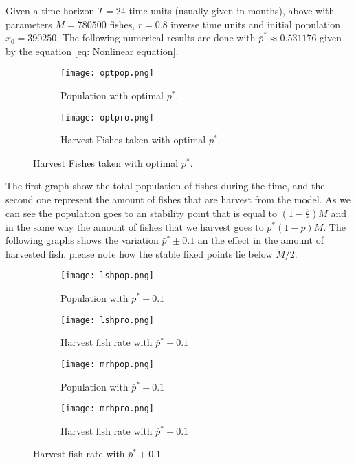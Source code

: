 Given a time horizon $\bar{T}=24$ time units (usually given in months), above with parameters $M=780500$ fishes, $r=0.8$ inverse time units and initial population $x_0=390250$. The following numerical results are done with $\bar{p}^*\approx 0.531176$ given by the equation \ref{eq: Nonlinear equation}. 

\begin{figure}[H]
	\centering
	\begin{subfigure}[b]{0.45\textwidth}
		\centering
		\texttt{[image: optpop.png]}
		\caption{Population with optimal $p^*$. }		
	\end{subfigure}
	\begin{subfigure}[b]{0.45\textwidth}
		\centering
		\texttt{[image: optpro.png]}
		\caption{Harvest Fishes taken with optimal $p^*$.}
	\end{subfigure}
\end{figure}

The first graph show the total population of fishes during the time, and the second one represent the amount of fishes that are harvest from the model. As we can see the population goes to an stability point that is equal to $\left(1-\frac{p}{r}\right)M$ and in the same way the amount of fishes that we harvest goes to $\bar{p}^*\left(1-\bar{p}\right)M$. The following graphs shows the variation $\bar{p}^*\pm0.1$  an the effect in the amount of harvested fish, please note how the stable fixed points lie below $M/2$:
\begin{figure}[H]
	\centering 
	\begin{subfigure}[b]{0.45\textwidth}
		\texttt{[image: lshpop.png]}
		\caption{Population with $\bar{p}^*-0.1$}		
	\end{subfigure}
	\begin{subfigure}[b]{0.45\textwidth}
		\texttt{[image: lshpro.png]}
		\caption{Harvest fish rate with $\bar{p}^*-0.1$}			
	\end{subfigure}
	\begin{subfigure}[b]{0.45\textwidth}
		\texttt{[image: mrhpop.png]}
		\caption{Population with $\bar{p}^*+0.1$}			
	\end{subfigure}
	\begin{subfigure}[b]{0.45\textwidth}
		\texttt{[image: mrhpro.png]}
		\caption{Harvest fish rate with $\bar{p}^*+0.1$}			
	\end{subfigure}
\end{figure} 

